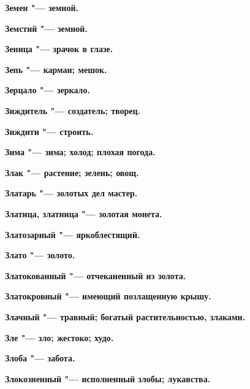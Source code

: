 \begin{multicols}{2}
\bfseries Земен\normalfont{} "--- земной. 




\bfseries Земстий\normalfont{} "--- земной. 




\bfseries Зеница\normalfont{} "--- зрачок в глазе. 




\bfseries Зепь\normalfont{} "--- карман; мешок. 




\bfseries Зерцало\normalfont{} "--- зеркало. 




\bfseries Зиждитель\normalfont{} "--- создатель; творец. 




\bfseries Зиждити\normalfont{} "--- строить. 




\bfseries Зима\normalfont{} "--- зима; холод; плохая погода. 




\bfseries Злак\normalfont{} "--- растение; зелень; овощ. 




\bfseries Златарь\normalfont{} "--- золотых дел мастер. 




\bfseries Златица, златница\normalfont{} "--- золотая монета. 




\bfseries Златозарный\normalfont{} "--- яркоблестящий. 




\bfseries Злато\normalfont{} "--- золото. 




\bfseries Златокованный\normalfont{} "--- отчеканенный из золота. 




\bfseries Златокровный\normalfont{} "--- имеющий позлащенную крышу. 




\bfseries Злачный\normalfont{} "--- травный; богатый растительностью, злаками. 




\bfseries Зле\normalfont{} "--- зло; жестоко; худо. 




\bfseries Злоба\normalfont{} "--- забота. 




\bfseries Злокозненный\normalfont{} "--- исполненный злобы; лукавства. 





\end{multicols}
